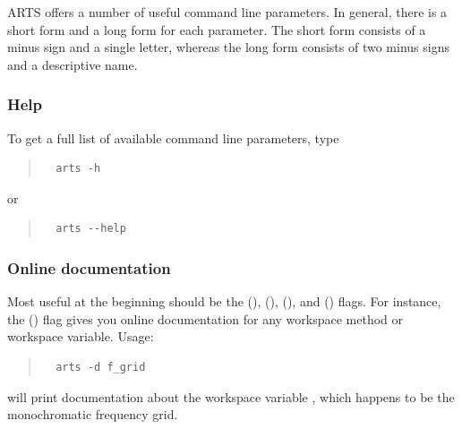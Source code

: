 ARTS offers a number of useful command line parameters. In general,
there is a short form and a long form for each parameter. The short
form consists of a minus sign and a single letter, whereas the long
form consists of two minus signs and a descriptive name. 

\subsubsection{Help}
To get a full list of available command line parameters, type
\begin{quote}
\begin{verbatim}
  arts -h
\end{verbatim}
\end{quote}
or
\begin{quote}
\begin{verbatim}
  arts --help
\end{verbatim}
\end{quote}

\subsubsection{Online documentation}
Most useful at the beginning should be the 
(),  (), 
(), and  () flags.
For instance, the  () flag gives you online
documentation for any workspace method or workspace variable. Usage:
\begin{quote}
\begin{verbatim}
  arts -d f_grid
\end{verbatim}
\end{quote}
will print documentation about the workspace variable , which
happens to be the monochromatic frequency grid.

